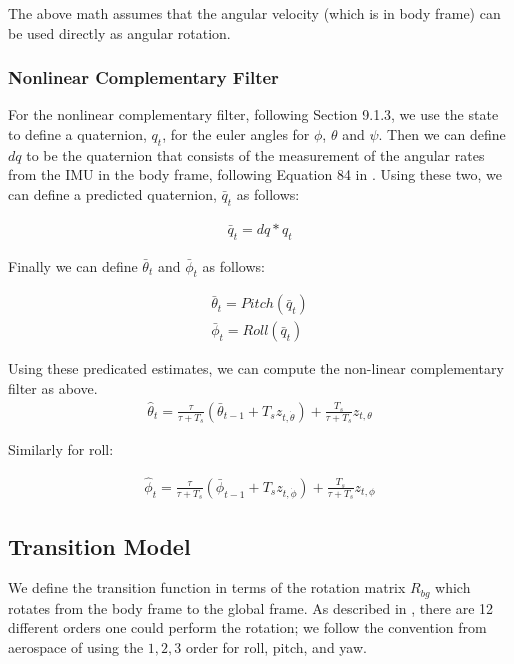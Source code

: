 \documentclass{article}
\begin{document}
The above math assumes that the angular velocity (which is in body
frame) can be used directly as angular rotation. 

\subsubsection{Nonlinear Complementary Filter}

For the nonlinear complementary filter, following
\citet{quan2017introduction} Section 9.1.3, we use the state to define
a quaternion, $q_t$, for the euler angles for $\phi$, $\theta$ and
$\psi$.  Then we can define $dq$ to be the quaternion that consists of
the measurement of the angular rates from the IMU in the body frame,
following Equation 84 in \citet{diebel2006representing}.  Using these
two, we can define a predicted quaternion, $\bar{q}_t$ as follows:

\begin{align}
  \bar{q}_t = dq * q_t 
\end{align}


Finally we can define $\bar{\theta}_t$ and $\bar{\phi}_t$ as follows:

\begin{align}
  \bar{\theta}_t = Pitch(\bar{q}_t)\\
  \bar{\phi}_t = Roll(\bar{q}_t)
\end{align}

Using these predicated estimates, we can compute the non-linear
complementary filter as above.
\begin{align}
  \hat{\theta}_t = \frac{\tau}{\tau + T_s} \left( \bar{\theta}_{t-1} + T_s z_{t,\dot{\theta}} \right) + \frac{T_s}{\tau + T_s} z_{t,\theta}
\end{align}

Similarly for roll: 

\begin{align}
  \hat{\phi}_t = \frac{\tau}{\tau + T_s} \left( \bar{\phi}_{t-1} + T_s z_{t,\dot{\phi}} \right) + \frac{T_s}{\tau + T_s} z_{t,\phi}
\end{align}


\subsection{Transition Model}


We define the transition function in terms of the rotation matrix
$R_{bg}$ which rotates from the body frame to the global frame.  As
described in \citet{diebel2006representing}, there are 12 different
orders one could perform the rotation; we follow the convention from
aerospace of using the $1,2,3$ order for roll, pitch, and yaw.
\end{document}

